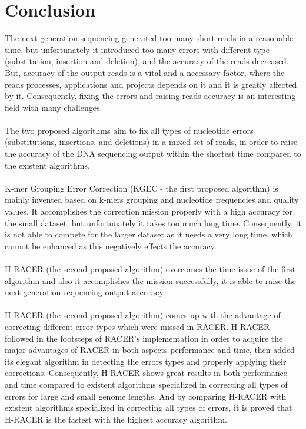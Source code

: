 \documentclass[12pt,openany]{llncs}
\begin{document}
\section{Conclusion}
The next-generation sequencing generated too many short reads in a reasonable time, but unfortunately it introduced too many errors with different type (substitution, insertion and deletion), and the accuracy of the reads decreased. But, accuracy of the output reads is a vital and a necessary factor, where the reads processes, applications and projects depends on it and  it is greatly affected by it. Consequently, fixing the errors and raising reads accuracy is an interesting field with many challenges.
\\
\\
The two proposed algorithms aim to fix all types of nucleotide errors (substitutions, insertions, and deletions) in a mixed set of reads, in order to raise the accuracy of the DNA sequencing output within the shortest time compared to the existent algorithms. 
\\
\\
K-mer Grouping Error Correction (KGEC - the first proposed algorithm) is mainly invented based on k-mers grouping and nucleotide frequencies and quality values. It accomplishes the correction mission properly with a high accuracy for the small dataset, but unfortunately it takes too much long time. Consequently, it is not able to compete for the larger dataset as it needs a very long time, which cannot be enhanced as this negatively effects the accuracy.
\\
\\
H-RACER (the second proposed algorithm) overcomes the time issue of the first algorithm and also it accomplishes the mission successfully, it is able to raise the next-generation sequencing output accuracy. 
\\
\\
H-RACER (the second proposed algorithm) comes up with the advantage of correcting different error types which were missed in RACER. H-RACER followed in the footsteps of RACER's implementation in order to acquire the major advantages of RACER in both aspects performance and time, then added its elegant algorithm in detecting the errors types and properly applying their corrections. Consequently, H-RACER shows great results in both performance and time compared to existent algorithms specialized in correcting all types of errors for large and small genome lengths. And by comparing H-RACER with existent algorithms specialized in correcting all types of errors, it is proved that H-RACER is the fastest with the highest accuracy algorithm.
\end{document}
